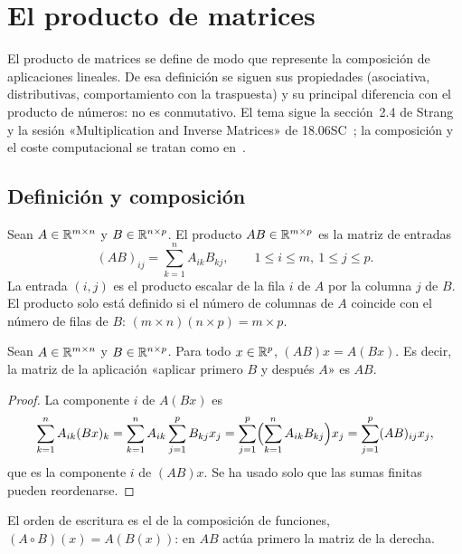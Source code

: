 \chapter{El producto de matrices}
\label{tema:4}

El producto de matrices se define de modo que represente la composición de aplicaciones lineales. De esa definición se siguen sus propiedades (asociativa, distributivas, comportamiento con la traspuesta) y su principal diferencia con el producto de números: no es conmutativo. El tema sigue la sección~2.4 de Strang~\cite{strang} y la sesión «Multiplication and Inverse Matrices» de 18.06SC~\cite{mit1806sc}; la composición y el coste computacional se tratan como en~\cite[§10.1 y §10.2]{vmls}.

\section{Definición y composición}

\begin{definicion}\label{def:producto}
Sean $A\in\mathbb{R}^{m\times n}$ y $B\in\mathbb{R}^{n\times p}$. El producto $AB\in\mathbb{R}^{m\times p}$ es la matriz de entradas
\[
(AB)_{ij}=\sum_{k=1}^{n}A_{ik}B_{kj},\qquad 1\le i\le m,\ 1\le j\le p.
\]
La entrada $(i,j)$ es el producto escalar de la fila $i$ de $A$ por la columna $j$ de $B$. El producto solo está definido si el número de columnas de $A$ coincide con el número de filas de $B$: $(m\times n)(n\times p)=m\times p$.
\end{definicion}

\begin{teorema}\label{teo:composicion}
Sean $A\in\mathbb{R}^{m\times n}$ y $B\in\mathbb{R}^{n\times p}$. Para todo $x\in\mathbb{R}^{p}$, $(AB)x=A(Bx)$. Es decir, la matriz de la aplicación «aplicar primero $B$ y después $A$» es $AB$.
\end{teorema}

\begin{proof}
La componente $i$ de $A(Bx)$ es
\[
\sum_{k=1}^{n}A_{ik}(Bx)_k=\sum_{k=1}^{n}A_{ik}\sum_{j=1}^{p}B_{kj}x_j=\sum_{j=1}^{p}\Bigl(\sum_{k=1}^{n}A_{ik}B_{kj}\Bigr)x_j=\sum_{j=1}^{p}(AB)_{ij}x_j,
\]
que es la componente $i$ de $(AB)x$. Se ha usado solo que las sumas finitas pueden reordenarse.
\end{proof}

El orden de escritura es el de la composición de funciones, $(A\circ B)(x)=A(B(x))$: en $AB$ actúa primero la matriz de la derecha.

